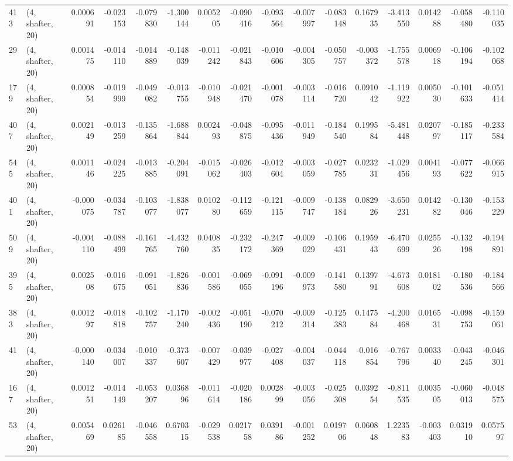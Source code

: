 \begin{tabular}{llrrrrrrrrrrrrrr}
413 &  (4, shafter, 20) &   0.000691 & -0.023153 & -0.079830 &   -1.300144 &  0.005205 &  -0.090416 &  -0.093564 & -0.007997 & -0.083148 &  0.167935 &   -3.413550 &  0.014288 &  -0.058480 &  -0.110035 \\
29  &  (4, shafter, 20) &   0.001475 & -0.014110 & -0.014889 &   -0.148039 & -0.011242 &  -0.021843 &  -0.010606 & -0.004305 & -0.050757 & -0.003372 &   -1.755578 &  0.006918 &  -0.106194 &  -0.102068 \\
179 &  (4, shafter, 20) &   0.000854 & -0.019999 & -0.049082 &   -0.013755 & -0.010948 &  -0.021470 &  -0.001078 & -0.003114 & -0.016720 &  0.091042 &   -1.119922 &  0.005030 &  -0.101633 &  -0.051414 \\
407 &  (4, shafter, 20) &   0.002149 & -0.013259 & -0.135864 &   -1.688844 &  0.002493 &  -0.048875 &  -0.095436 & -0.011949 & -0.184540 &  0.199584 &   -5.481448 &  0.020797 &  -0.185117 &  -0.233584 \\
545 &  (4, shafter, 20) &   0.001146 & -0.024225 & -0.013885 &   -0.204091 & -0.015062 &  -0.026403 &  -0.012604 & -0.003059 & -0.027785 &  0.023231 &   -1.029456 &  0.004193 &  -0.077622 &  -0.066915 \\
401 &  (4, shafter, 20) &  -0.000075 & -0.034787 & -0.103077 &   -1.838077 &  0.010280 &  -0.112659 &  -0.121115 & -0.009747 & -0.138184 &  0.082926 &   -3.650231 &  0.014282 &  -0.130046 &  -0.153229 \\
509 &  (4, shafter, 20) &  -0.004110 & -0.088499 & -0.161765 &   -4.432760 &  0.040835 &  -0.232172 &  -0.247369 & -0.009029 & -0.106431 &  0.195943 &   -6.470699 &  0.025526 &  -0.132198 &  -0.194891 \\
395 &  (4, shafter, 20) &   0.002508 & -0.016675 & -0.091051 &   -1.826836 & -0.001586 &  -0.069055 &  -0.091196 & -0.009973 & -0.141580 &  0.139791 &   -4.673608 &  0.018102 &  -0.180536 &  -0.184566 \\
383 &  (4, shafter, 20) &   0.001297 & -0.018818 & -0.102757 &   -1.170240 & -0.002436 &  -0.051190 &  -0.070212 & -0.009314 & -0.125383 &  0.147584 &   -4.200468 &  0.016531 &  -0.098753 &  -0.159061 \\
41  &  (4, shafter, 20) &  -0.000140 & -0.034007 & -0.010337 &   -0.373607 & -0.007429 &  -0.039977 &  -0.027408 & -0.004037 & -0.044118 & -0.016854 &   -0.767796 &  0.003340 &  -0.043245 &  -0.046301 \\
167 &  (4, shafter, 20) &   0.001251 & -0.014149 & -0.053207 &    0.036896 & -0.011614 &  -0.020186 &   0.002899 & -0.003056 & -0.025308 &  0.039254 &   -0.811535 &  0.003505 &  -0.060013 &  -0.048575 \\
53  &  (4, shafter, 20) &   0.005469 &  0.026185 & -0.046558 &    0.670315 & -0.029538 &   0.021758 &   0.039186 & -0.001252 &  0.019706 &  0.060848 &    1.223583 & -0.003403 &   0.031910 &   0.057597 \\
\bottomrule
\end{tabular}
